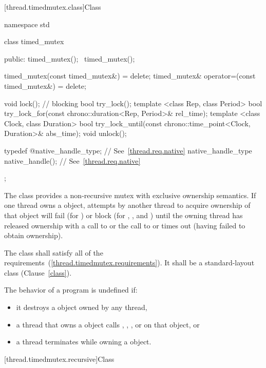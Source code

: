 [thread.timedmutex.class]{Class }

\begin{codeblock}
namespace std {
  class timed_mutex {
  public:
    timed_mutex();
    ~timed_mutex();

    timed_mutex(const timed_mutex&) = delete;
    timed_mutex& operator=(const timed_mutex&) = delete;

    void lock();  // blocking
    bool try_lock();
    template <class Rep, class Period>
      bool try_lock_for(const chrono::duration<Rep, Period>& rel_time);
    template <class Clock, class Duration>
      bool try_lock_until(const chrono::time_point<Clock, Duration>& abs_time);
    void unlock();

    typedef @\impdef@ native_handle_type; // See~\ref{thread.req.native}
    native_handle_type native_handle();                // See~\ref{thread.req.native}
  };
}
\end{codeblock}

\pnum
The class  provides a non-recursive mutex with exclusive ownership
semantics. If one thread owns a  object, attempts by another thread
to acquire ownership of that object will fail (for ) or block
(for , , and ) until
the owning thread has released ownership with a call to  or the
call to  or  times out (having
failed to obtain ownership).

\pnum
The class  shall satisfy all of the 
requirements~(\ref{thread.timedmutex.requirements}). It shall be a standard-layout
class (Clause~\ref{class}).

\pnum
The behavior of a program is undefined if:

\begin{itemize}
\item it destroys a  object owned by any thread,
\item a thread that owns a  object calls ,
, , or  on that object, or
\item a thread terminates while owning a  object.
\end{itemize}

[thread.timedmutex.recursive]{Class }

